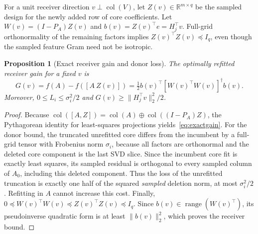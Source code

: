 \documentclass[review,10pt]{elsarticle}
\newtheorem{proposition}{Proposition}
\newcommand{\R}{\mathbb R}
\begin{document}
For a unit receiver direction $v\perp\operatorname{col}(V)$, let $Z(v)\in\R^{m\times q}$ be the sampled design for the newly added row of core coefficients. Let $W(v)=(I-P_A)Z(v)$ and $b(v)=Z(v)^\top e=H_j^\top v$. Full-grid orthonormality of the remaining factors implies $Z(v)^\top Z(v)\preceq I_q$, even though the sampled feature Gram need not be isotropic.

\begin{proposition}[Exact receiver gain and donor loss]\label{prop:gain}
The optimally refitted receiver gain for a fixed $v$ is
\begin{equation}\label{eq:exactgain}
G(v)=f(A)-f([A\ Z(v)])=\tfrac12 b(v)^\top[W(v)^\top W(v)]^\dagger b(v).
\end{equation}
Moreover, $0\le L_i\le\sigma_i^2/2$ and $G(v)\ge\|H_j^\top v\|_2^2/2$.
\end{proposition}
\begin{proof}
Because $\operatorname{col}([A,Z])=\operatorname{col}(A)\oplus\operatorname{col}((I-P_A)Z)$, the Pythagorean identity for least-squares projections yields~\eqref{eq:exactgain}. For the donor bound, the truncated unrefitted core differs from the incumbent by a full-grid tensor with Frobenius norm $\sigma_i$, because all factors are orthonormal and the deleted core component is the last SVD slice. Since the incumbent core fit is exactly least squares, its sampled residual is orthogonal to every sampled column of $A_0$, including this deleted component. Thus the loss of the unrefitted truncation is exactly one half of the squared \emph{sampled} deletion norm, at most $\sigma_i^2/2$. Refitting in $A$ cannot increase this cost. Finally, $0\preceq W(v)^\top W(v)\preceq Z(v)^\top Z(v)\preceq I_q$. Since $b(v)\in\operatorname{range}(W(v)^\top)$, its pseudoinverse quadratic form is at least $\|b(v)\|_2^2$, which proves the receiver bound.\end{proof}
\end{document}
